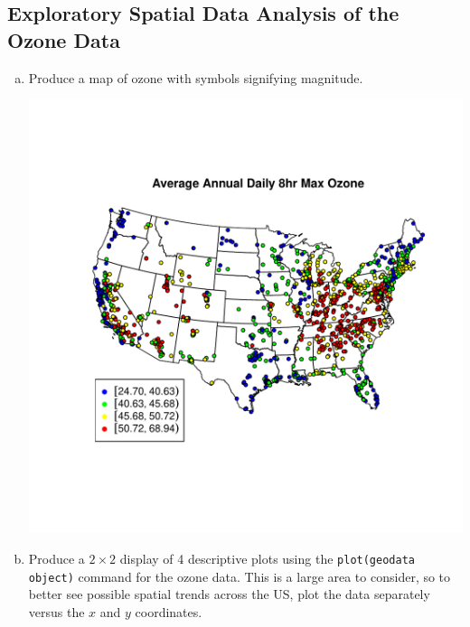 \documentclass[letterpaper, 12pt]{article}\usepackage[]{graphicx}\usepackage[]{color}
\makeatletter
\def\maxwidth{ %
  \ifdim\Gin@nat@width>\linewidth
    \linewidth
  \else
    \Gin@nat@width
  \fi
}
\newenvironment{knitrout}{}{} %
\makeatother
\begin{document}
\subsection*{Exploratory Spatial Data Analysis of the Ozone Data}
\begin{enumerate}[a.]
\item
Produce a map of ozone with symbols signifying magnitude.




\begin{knitrout}
\color{fgcolor}
\includegraphics[width=\maxwidth]{figure/ozonemap} 

\end{knitrout}


\item
Produce a $2\times 2$ display of 4 descriptive plots using the \texttt{plot(geodata object)} command for the ozone data. This is a large area to consider, so to better see possible spatial trends across the US, plot the data separately versus the $x$ and $y$ coordinates.


\end{enumerate}
\end{document}
